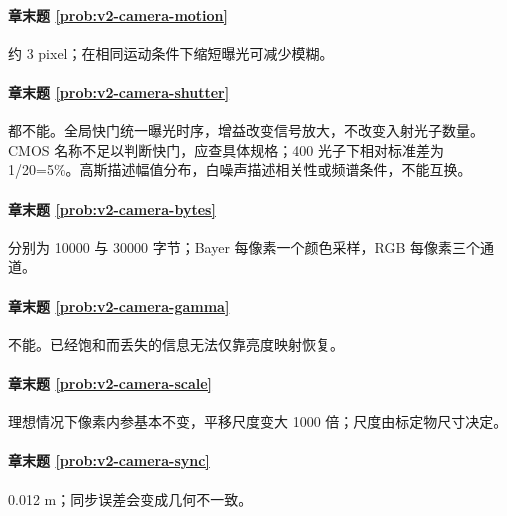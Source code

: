 \paragraph*{章末题 \ref{prob:v2-camera-motion}}
\begin{solution}
约 3 pixel；在相同运动条件下缩短曝光可减少模糊。
\end{solution}

\paragraph*{章末题 \ref{prob:v2-camera-shutter}}
\begin{solution}
都不能。全局快门统一曝光时序，增益改变信号放大，不改变入射光子数量。CMOS 名称不足以判断快门，应查具体规格；400 光子下相对标准差为1/20=5\%。高斯描述幅值分布，白噪声描述相关性或频谱条件，不能互换。
\end{solution}

\paragraph*{章末题 \ref{prob:v2-camera-bytes}}
\begin{solution}
分别为 10000 与 30000 字节；Bayer 每像素一个颜色采样，RGB 每像素三个通道。
\end{solution}

\paragraph*{章末题 \ref{prob:v2-camera-gamma}}
\begin{solution}
不能。已经饱和而丢失的信息无法仅靠亮度映射恢复。
\end{solution}

\paragraph*{章末题 \ref{prob:v2-camera-scale}}
\begin{solution}
理想情况下像素内参基本不变，平移尺度变大 1000 倍；尺度由标定物尺寸决定。
\end{solution}

\paragraph*{章末题 \ref{prob:v2-camera-sync}}
\begin{solution}
0.012 m；同步误差会变成几何不一致。
\end{solution}

